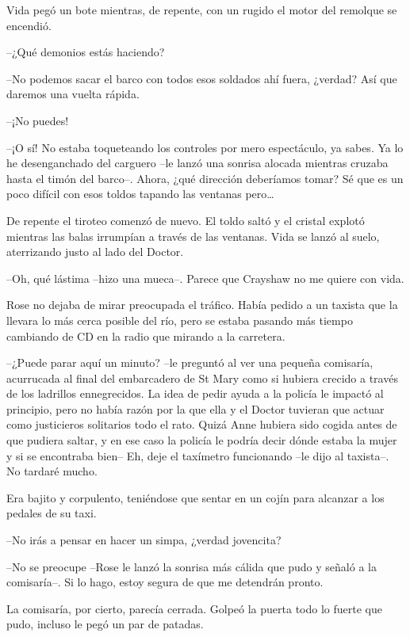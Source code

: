{Vida pegó un bote mientras, de repente, con un rugido el motor del
remolque se encendió.}

{--¿Qué demonios estás haciendo?}

{--No podemos sacar el barco con todos esos soldados ahí fuera, ¿verdad?
Así que daremos una vuelta rápida.}

{--¡No puedes!}

{--¡O sí! No estaba toqueteando los controles por mero espectáculo, ya
 sabes. Ya lo he desenganchado del carguero --le lanzó una sonrisa
 alocada mientras cruzaba hasta el timón del barco--. Ahora, ¿qué
 dirección deberíamos tomar? Sé que es un poco difícil con esos toldos
 tapando las ventanas pero\ldots{}}

{De repente el tiroteo comenzó de nuevo. El toldo saltó y el cristal
 explotó mientras las balas irrumpían a través de las ventanas. Vida se
lanzó al suelo, aterrizando justo al lado del Doctor.}

{--Oh, qué lástima --hizo una mueca--. Parece que Crayshaw no me quiere
con vida.}

\mbox{}

{Rose no dejaba de mirar preocupada el tráfico. Había pedido a un
 taxista que la llevara lo más cerca posible del río, pero se estaba
 pasando más tiempo cambiando de CD en la radio que mirando a la
carretera.}

{--¿Puede parar aquí un minuto? --le preguntó al ver una pequeña
 comisaría, acurrucada al final del embarcadero de St Mary como si
 hubiera crecido a través de los ladrillos ennegrecidos. La idea de pedir
 ayuda a la policía le impactó al principio, pero no había razón por la
 que ella y el Doctor tuvieran que actuar como justicieros solitarios
 todo el rato. Quizá Anne hubiera sido cogida antes de que pudiera
 saltar, y en ese caso la policía le podría decir dónde estaba la mujer y
 si se encontraba bien-- Eh, deje el taxímetro funcionando --le dijo al
taxista--. No tardaré mucho.}

{Era bajito y corpulento, teniéndose que sentar en un cojín para
alcanzar a los pedales de su taxi.}

{--No irás a pensar en hacer un simpa, ¿verdad jovencita?}

{--No se preocupe --Rose le lanzó la sonrisa más cálida que pudo y
 señaló a la comisaría--. Si lo hago, estoy segura de que me detendrán
pronto.}

{La comisaría, por cierto, parecía cerrada. Golpeó la puerta todo lo
fuerte que pudo, incluso le pegó un par de patadas.}


